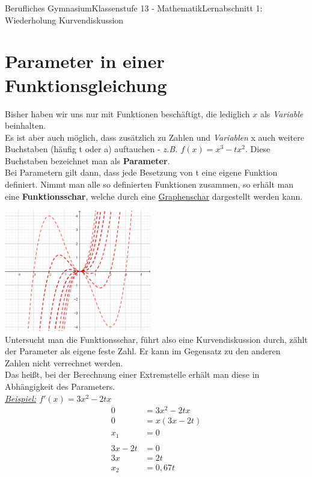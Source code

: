 \documentclass[11pt,twocolumn,oneside,openany,headings=optiontotoc,11pt,numbers=noenddot]{article}
\begin{document}
\begin{worksheet}{Berufliches Gymnasium}{Klassenstufe 13 - Mathematik}{Lernabschnitt 1: Wiederholung Kurvendiskussion}
		\section{Parameter in einer Funktionsgleichung}
		Bisher haben wir uns nur mit Funktionen beschäftigt, die lediglich \(x\) als \textit{Variable} beinhalten.\\
		Es ist aber auch möglich, dass zusätzlich zu Zahlen und \textit{Variablen} \glqq{}x\grqq{} auch weitere Buchstaben (häufig \glqq{}t\grqq{} oder \glqq{}a\grqq{}) auftauchen - \textit{z.B. \(f(x) = x^3 - tx^2\)}. Diese Buchstaben bezeichnet man als \textbf{Parameter}.\\
		Bei Parametern gilt dann, dass jede Besetzung von t eine eigene Funktion definiert. Nimmt man alle so definierten Funktionen zusammen, so erhält man eine \textbf{Funktionsschar}, welche durch eine \underline{Graphenschar} dargestellt werden kann.\\
		\par\noindent
		\includegraphics[width=0.48\textwidth]{../99_Bilder/00_Wdh/fSchr.png}\\
		Untersucht man die Funktionsschar, führt also eine Kurvendiskussion durch, zählt der Parameter als eigene feste Zahl. Er kann im Gegensatz zu den anderen Zahlen nicht verrechnet werden.\\
		Das heißt, bei der Berechnung einer Extremstelle erhält man diese in Abhängigkeit des Parameters.\\
		\textit{\underline{Beispiel:} \(f'(x) = 3x^2 -2tx\)}
		\begin{align*}
			0 & = 3x^2 - 2tx\\
			0 & = x(3x - 2t)\\
			x_1 & = 0\\
			\\
			3x - 2t & = 0\\
			3x & = 2t\\
			x_2 & = 0,67t
		\end{align*}
	\end{worksheet}
\end{document}
